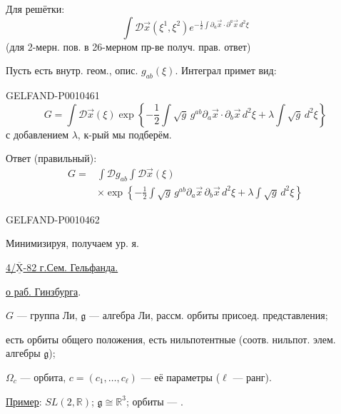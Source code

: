 Для решётки:
\begin{equation*}
\int\mathcal{D}\vec{x}(\xi^1,\xi^2)
e^{-\frac12\int\partial_a\vec{x}\cdot\partial^a\vec{x}\,d^2\xi}
\tag{26}
\end{equation*}
(для 2-мерн. пов. в 26-мерном пр-ве получ. прав. ответ)

Пусть есть внутр. геом., опис. $g_{ab}(\xi)$. Интеграл примет вид:


\begin{GelfandAdjacentEvidence}{GELFAND-P001046}{1}
\begin{equation*}
G=\int\mathcal D\vec{x}(\xi)
\exp\left\{-\frac12\int\sqrt{g}\,g^{ab}\partial_a\vec{x}\cdot\partial_b\vec{x}\,d^2\xi
+\lambda\int\sqrt{g}\,d^2\xi\right\}
\tag{27}
\end{equation*}
с добавлением $\lambda$, к-рый мы подберём.

Ответ (правильный):
\begin{equation*}
\begin{aligned}
G={}&\int\mathcal Dg_{ab}\int\mathcal D\vec{x}(\xi)\\
&\times\exp\left\{-\frac12\int\sqrt{g}\,g^{ab}\partial_a\vec{x}\,\partial_b\vec{x}\,d^2\xi
+\lambda\int\sqrt{g}\,d^2\xi\right\}
\end{aligned}
\tag{28}
\end{equation*}
\end{GelfandAdjacentEvidence}
\begin{GelfandAdjacentEvidence}{GELFAND-P001046}{2}


Минимизируя, получаем ур. я.

\medskip
\underline{4/$\overline{\underline{\mathrm{X}}}$-82 г.}\quad\underline{Сем. Гельфанда.}

\underline{ о раб. Гинзбурга}.

$G$ — группа Ли, $\mathfrak g$ — алгебра Ли, рассм. орбиты присоед. представления;

есть орбиты общего положения, есть нильпотентные (соотв. нильпот. элем. алгебры $\mathfrak g$);

$\Omega_c$ — орбита, $c=(c_1,\ldots,c_\ell)$ — её параметры ($\ell$ — ранг).

\underline{Пример}: $SL(2,\mathbb R)$; $\mathfrak g\cong\mathbb R^3$; орбиты — .
\end{GelfandAdjacentEvidence}
